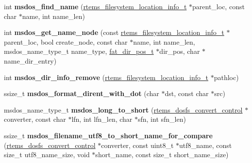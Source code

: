 \begin{DoxyCompactItemize}
int {\bfseries msdos\+\_\+find\+\_\+name} (\mbox{\hyperlink{group__LibIO_ga3252b3d31ee3c49ffff0b7604a676864}{rtems\+\_\+filesystem\+\_\+location\+\_\+info\+\_\+t}} $\ast$parent\+\_\+loc, const char $\ast$name, int name\+\_\+len)
\item 
\mbox{\label{group__libfs__msdos_gadb25db33ce0607f51b7c5e8eb8bcd5f8}} 
int {\bfseries msdos\+\_\+get\+\_\+name\+\_\+node} (const \mbox{\hyperlink{group__LibIO_ga3252b3d31ee3c49ffff0b7604a676864}{rtems\+\_\+filesystem\+\_\+location\+\_\+info\+\_\+t}} $\ast$parent\+\_\+loc, bool create\+\_\+node, const char $\ast$name, int name\+\_\+len, msdos\+\_\+name\+\_\+type\+\_\+t name\+\_\+type, \mbox{\hyperlink{structfat__dir__pos__s}{fat\+\_\+dir\+\_\+pos\+\_\+t}} $\ast$dir\+\_\+pos, char $\ast$name\+\_\+dir\+\_\+entry)
\item 
\mbox{\label{group__libfs__msdos_ga13bdebf80afd36c3702d1f91528f0161}} 
int {\bfseries msdos\+\_\+dir\+\_\+info\+\_\+remove} (\mbox{\hyperlink{group__LibIO_ga3252b3d31ee3c49ffff0b7604a676864}{rtems\+\_\+filesystem\+\_\+location\+\_\+info\+\_\+t}} $\ast$pathloc)
\item 
\mbox{\label{group__libfs__msdos_gaf58e3af09bbf1b5ff39fb8bc002b4dd5}} 
ssize\+\_\+t {\bfseries msdos\+\_\+format\+\_\+dirent\+\_\+with\+\_\+dot} (char $\ast$dst, const char $\ast$src)
\item 
\mbox{\label{group__libfs__msdos_gaf629d1323e36118a53f4924a0901ac65}} 
msdos\+\_\+name\+\_\+type\+\_\+t {\bfseries msdos\+\_\+long\+\_\+to\+\_\+short} (\mbox{\hyperlink{structrtems__dosfs__convert__control}{rtems\+\_\+dosfs\+\_\+convert\+\_\+control}} $\ast$converter, const char $\ast$lfn, int lfn\+\_\+len, char $\ast$sfn, int sfn\+\_\+len)
\item 
\mbox{\label{group__libfs__msdos_ga09990f947865be1ec4b40bba5172c44b}} 
ssize\+\_\+t {\bfseries msdos\+\_\+filename\+\_\+utf8\+\_\+to\+\_\+short\+\_\+name\+\_\+for\+\_\+compare} (\mbox{\hyperlink{structrtems__dosfs__convert__control}{rtems\+\_\+dosfs\+\_\+convert\+\_\+control}} $\ast$converter, const uint8\+\_\+t $\ast$utf8\+\_\+name, const size\+\_\+t utf8\+\_\+name\+\_\+size, void $\ast$short\+\_\+name, const size\+\_\+t short\+\_\+name\+\_\+size)
\item 

\end{DoxyCompactItemize}
